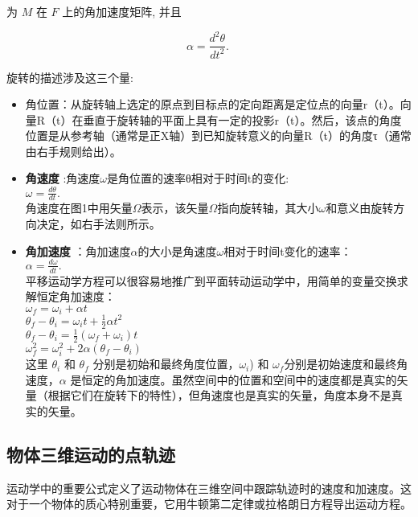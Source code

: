 为 $M$ 在 $F$ 上的角加速度矩阵, 并且

\begin{equation}
\alpha = \frac{d^2 \theta}{dt^2}.~
\end{equation}

旋转的描述涉及这三个量:

\begin{itemize}
\item 角位置：从旋转轴上选定的原点到目标点的定向距离是定位点的向量r（t）。向量R（t）在垂直于旋转轴的平面上具有一定的投影r（t）。然后，该点的角度位置是从参考轴（通常是正X轴）到已知旋转意义的向量R（t）的角度τ（通常由右手规则给出）。
\item \textbf{角速度} :角速度$\omega$是角位置的速率θ相对于时间t的变化:\\
$\omega = \frac{d\theta}{dt}.$\\
角速度在图1中用矢量$\Omega$表示，该矢量$\Omega$指向旋转轴，其大小$\omega$和意义由旋转方向决定，如右手法则所示。
\item \textbf{角加速度} ：角加速度$\alpha$的大小是角速度$\omega$相对于时间t变化的速率：\\
$\alpha = \frac{d\omega}{dt}.$\\
平移运动学方程可以很容易地推广到平面转动运动学中，用简单的变量交换求解恒定角加速度：\\
$\omega_f = \omega_i + \alpha t$\\
$\theta_f - \theta_i = \omega_i t + \frac{1}{2} \alpha t^2$\\
$\theta_f - \theta_i = \frac{1}{2} (\omega_f + \omega_i) t$\\
$\omega_f^2 = \omega_i^2 + 2 \alpha (\theta_f - \theta_i)$\\

这里 $\theta_i$ 和 $\theta_f$ 分别是初始和最终角度位置，$\omega_i$) 和 $\omega_f$分别是初始速度和最终角速度，$\alpha$ 是恒定的角加速度。虽然空间中的位置和空间中的速度都是真实的矢量（根据它们在旋转下的特性），但角速度也是真实的矢量，角度本身不是真实的矢量。

\end{itemize}

\subsection{物体三维运动的点轨迹}

运动学中的重要公式定义了运动物体在三维空间中跟踪轨迹时的速度和加速度。这对于一个物体的质心特别重要，它用牛顿第二定律或拉格朗日方程导出运动方程。

